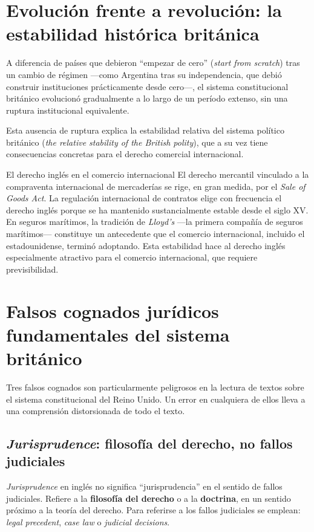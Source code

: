 \documentclass[12pt,oneside]{book}
\begin{document}
\section{Evolución frente a revolución: la estabilidad histórica británica}

A diferencia de países que debieron ``empezar de cero'' (\textit{start from scratch}) tras un cambio de régimen ---como Argentina tras su independencia, que debió construir instituciones prácticamente desde cero---, el sistema constitucional británico evolucionó gradualmente a lo largo de un período extenso, sin una ruptura institucional equivalente.

Esta ausencia de ruptura explica la estabilidad relativa del sistema político británico (\textit{the relative stability of the British polity}), que a su vez tiene consecuencias concretas para el derecho comercial internacional.

\begin{example}{El derecho inglés en el comercio internacional}
El derecho mercantil vinculado a la compraventa internacional de mercaderías se rige, en gran medida, por el \textit{Sale of Goods Act}. La regulación internacional de contratos elige con frecuencia el derecho inglés porque se ha mantenido sustancialmente estable desde el siglo XV. En seguros marítimos, la tradición de \textit{Lloyd's} ---la primera compañía de seguros marítimos--- constituye un antecedente que el comercio internacional, incluido el estadounidense, terminó adoptando. Esta estabilidad hace al derecho inglés especialmente atractivo para el comercio internacional, que requiere previsibilidad.
\end{example}

\section{Falsos cognados jurídicos fundamentales del sistema británico}
\label{sec:falsos-cognados-uk}

Tres falsos cognados son particularmente peligrosos en la lectura de textos sobre el sistema constitucional del Reino Unido. Un error en cualquiera de ellos lleva a una comprensión distorsionada de todo el texto.

\subsection{\textit{Jurisprudence}: filosofía del derecho, no fallos judiciales}

\begin{important}
\textit{Jurisprudence} en inglés no significa ``jurisprudencia'' en el sentido de fallos judiciales. Refiere a la \textbf{filosofía del derecho} o a la \textbf{doctrina}, en un sentido próximo a la teoría del derecho. Para referirse a los fallos judiciales se emplean: \textit{legal precedent}, \textit{case law} o \textit{judicial decisions}.
\end{important}
\end{document}
